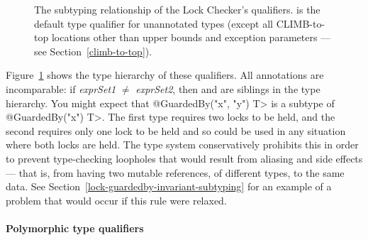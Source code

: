 \begin{figure}
\caption{The subtyping relationship of the Lock Checker's qualifiers.
 is the default type qualifier for unannotated
types (except all CLIMB-to-top locations other than upper bounds and exception
parameters --- see Section~\ref{climb-to-top}).
}
\label{fig-lock-guardedby-hierarchy}
\end{figure}

Figure~\ref{fig-lock-guardedby-hierarchy} shows the type hierarchy of these
qualifiers.
All  annotations are incomparable:
if \emph{exprSet1} $\neq$ \emph{exprSet2}, then  and
 are siblings in the type hierarchy.
You might expect that
\<@GuardedBy({"x", "y"}) T> is a subtype of \<@GuardedBy({"x"}) T>.  The
first type requires two locks to be held, and the second requires only one
lock to be held and so could be used in any situation where both locks are
held.  The type system conservatively prohibits this in order to prevent
type-checking loopholes that would result from aliasing and side effects
--- that is, from having two mutable references, of different types, to the
same data. See
Section~\ref{lock-guardedby-invariant-subtyping} for an example
of a problem that would occur if this rule were relaxed.


\paragraph{Polymorphic type qualifiers\label{lock-polymorphic-type-qualifiers}}


